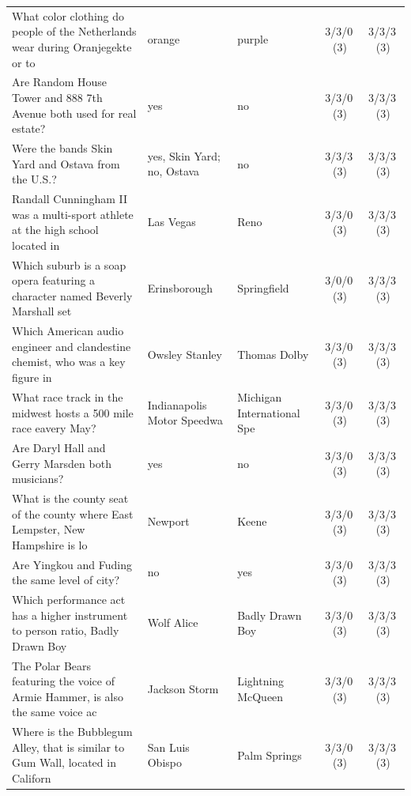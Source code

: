 \begin{longtable}{@{}p{6.6cm}p{2.9cm}p{2.9cm}cc@{}}
\rowcolor{neutralgray}
What color clothing do people of the Netherlands wear during Oranjegekte or to & orange & purple & 3/3/0\,\footnotesize(3) & 3/3/3\,\footnotesize(3) \\
Are Random House Tower and 888 7th Avenue both used for real estate? & yes & no & 3/3/0\,\footnotesize(3) & 3/3/3\,\footnotesize(3) \\
\rowcolor{neutralgray}
Were the bands Skin Yard and Ostava from the U.S.? & yes, Skin Yard; no, Ostava & no & 3/3/3\,\footnotesize(3) & 3/3/3\,\footnotesize(3) \\
Randall Cunningham II was a multi-sport athlete at the high school located in  & Las Vegas & Reno & 3/3/0\,\footnotesize(3) & 3/3/3\,\footnotesize(3) \\
\rowcolor{neutralgray}
Which suburb is a soap opera featuring a character named Beverly Marshall set  & Erinsborough & Springfield & 3/0/0\,\footnotesize(3) & 3/3/3\,\footnotesize(3) \\
Which American audio engineer and clandestine chemist, who was a key figure in & Owsley Stanley & Thomas Dolby & 3/3/0\,\footnotesize(3) & 3/3/3\,\footnotesize(3) \\
\rowcolor{neutralgray}
What race track in the midwest hosts a 500 mile race eavery May? & Indianapolis Motor Speedwa & Michigan International Spe & 3/3/0\,\footnotesize(3) & 3/3/3\,\footnotesize(3) \\
Are Daryl Hall and Gerry Marsden both musicians? & yes & no & 3/3/0\,\footnotesize(3) & 3/3/3\,\footnotesize(3) \\
\rowcolor{neutralgray}
What is the county seat of the county where East Lempster, New Hampshire is lo & Newport & Keene & 3/3/0\,\footnotesize(3) & 3/3/3\,\footnotesize(3) \\
Are Yingkou and Fuding the same level of city? & no & yes & 3/3/0\,\footnotesize(3) & 3/3/3\,\footnotesize(3) \\
\rowcolor{neutralgray}
Which performance act has a higher instrument to person ratio, Badly Drawn Boy & Wolf Alice & Badly Drawn Boy & 3/3/0\,\footnotesize(3) & 3/3/3\,\footnotesize(3) \\
The Polar Bears featuring the voice of Armie Hammer, is also the same voice ac & Jackson Storm & Lightning McQueen & 3/3/0\,\footnotesize(3) & 3/3/3\,\footnotesize(3) \\
\rowcolor{neutralgray}
Where is the Bubblegum Alley, that is similar to Gum Wall, located in Californ & San Luis Obispo & Palm Springs & 3/3/0\,\footnotesize(3) & 3/3/3\,\footnotesize(3) \\

\end{longtable}
